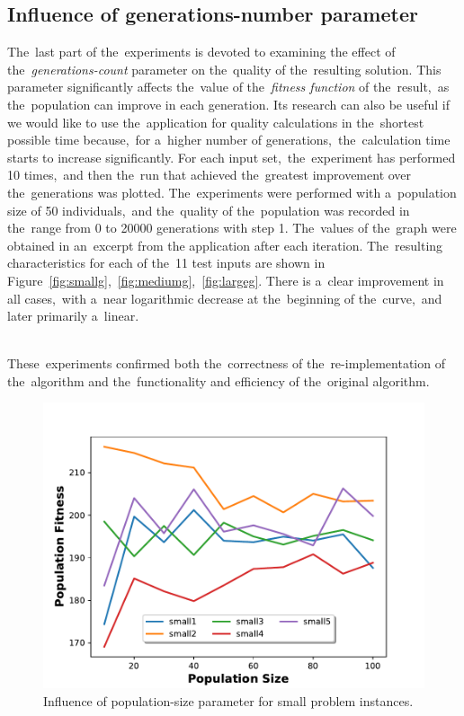 \subsection{Influence of generations-number parameter}
The~last part of the~experiments is devoted to examining the effect of the~\textit{generations-count} parameter on the~quality of the~resulting solution.
This parameter significantly affects the~value of the~\textit{fitness function} of the~result,~as the~population can improve in each generation.
Its research can also be useful if we would like to use the~application for quality calculations in the~shortest possible time because,~for a~higher number of generations,~the~calculation time starts to increase significantly.
For each input set,~the~experiment has performed 10 times,~and then the~run that achieved the~greatest improvement over the~generations was plotted.
The~experiments were performed with a~population size of 50 individuals,~and the~quality of the~population was recorded in the~range from 0 to 20000 generations with step 1. 
The~values of the~graph were obtained in an~excerpt from the application after each iteration.
The~resulting characteristics for each of the~11 test inputs are shown in Figure~\ref{fig:smallg},~\ref{fig:mediumg},~\ref{fig:largeg}. 
There is a~clear improvement in all cases,~with a~near logarithmic decrease at the~beginning of the~curve,~and later primarily a~linear.

\noindent \\
These~experiments confirmed both the~correctness of the~re-implementation of the~algorithm and the~functionality and efficiency of the~original algorithm.

\begin{figure}[h]
\centering
\includegraphics[height=0.30\textheight]{figures/small_population.pdf}
\caption{Influence of population-size parameter for small problem instances.}%
\label{fig:smallp}%
\end{figure}

